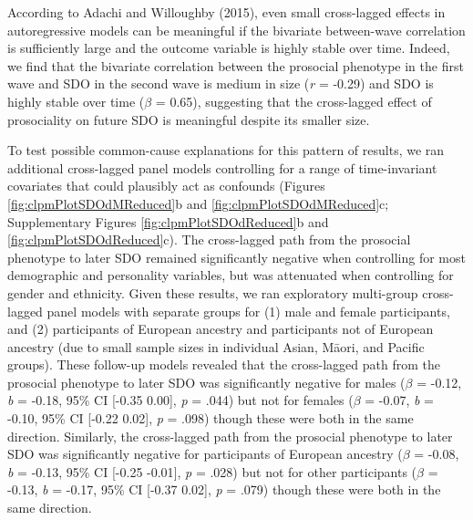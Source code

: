 \documentclass[
  man,floatsintext]{apa6}
\begin{document}
According to Adachi and Willoughby (2015), even small cross-lagged effects in autoregressive
models can be meaningful if the bivariate between-wave correlation is
sufficiently large and the outcome variable is highly stable over time. Indeed,
we find that the bivariate correlation between the prosocial phenotype in the
first wave and SDO in the second wave is medium in size (\emph{r} =
-0.29) and
SDO is highly stable over time (\(\beta\) =
0.65), suggesting that
the cross-lagged effect of prosociality on future SDO is meaningful despite its
smaller size.

To test possible common-cause explanations for this pattern of results,
we ran additional cross-lagged panel models controlling for a range of
time-invariant covariates that could plausibly act as confounds (Figures
\ref{fig:clpmPlotSDOdMReduced}b and \ref{fig:clpmPlotSDOdMReduced}c;
Supplementary Figures \ref{fig:clpmPlotSDOdReduced}b and
\ref{fig:clpmPlotSDOdReduced}c). The cross-lagged path from the prosocial
phenotype to later SDO remained significantly negative when controlling for most
demographic and personality variables, but was attenuated when controlling for
gender and ethnicity. Given these results, we ran exploratory multi-group
cross-lagged panel models with separate groups for (1) male and female
participants, and (2) participants of European ancestry and participants not of
European ancestry (due to small sample sizes in individual Asian, Māori, and
Pacific groups). These follow-up models revealed that the cross-lagged path from
the prosocial phenotype to later SDO was significantly negative for males
(\(\beta\) = -0.12,
\emph{b} = -0.18, 95\% CI {[}-0.35
0.00{]}, \emph{p} = .044) but not for females
(\(\beta\) = -0.07,
\emph{b} = -0.10, 95\% CI {[}-0.22
0.02{]}, \emph{p} = .098) though these were both
in the same direction. Similarly, the cross-lagged path from the prosocial
phenotype to later SDO was significantly negative for participants of European
ancestry (\(\beta\) =
-0.08,
\emph{b} = -0.13, 95\% CI {[}-0.25
-0.01{]}, \emph{p} = .028) but not for other
participants (\(\beta\) =
-0.13,
\emph{b} = -0.17, 95\% CI {[}-0.37
0.02{]}, \emph{p} = .079) though these were both
in the same direction.
\end{document}
